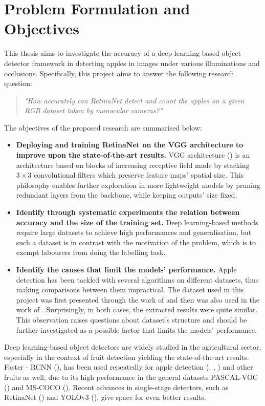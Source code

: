 \section{Problem Formulation and Objectives}
This thesis aims to investigate the accuracy of a deep learning-based object detector framework in detecting apples in images under various illuminations and occlusions. Specifically, this project aims to answer the following research question:

\begin{quote}
\centering 
\textit{"How accurately can RetinaNet detect and count the apples on a given RGB dataset taken by monocular cameras?"}
\end{quote}

The objectives of the proposed research are summarised below:

\begin{itemize}
\item \textbf{Deploying and training RetinaNet on the VGG architecture to improve upon the state-of-the-art results.} VGG architecture (\cite{simonyan2014very}) is an architecture based on blocks of increasing receptive field made by stacking $3\times3$ convolutional filters which preserve feature maps' spatial size. This philosophy enables further exploration in more lightweight models by pruning redundant layers from the backbone, while keeping outputs' size fixed.  
\item \textbf{Identify through systematic experiments the relation between accuracy and the size of the training set.} Deep learning-based methods require large datasets to achieve high performances and generalisation, but such a dataset is in contrast with the motivation of the problem, which is to exempt labourers from doing the labelling task.
\item \textbf{Identify the causes that limit the models' performance.} Apple detection has been tackled with several algorithms on different datasets, thus making comparisons between them impractical. The dataset used in this project was first presented through the work of \cite{bargoti2017deep} and then was also used in the work of \cite{liang2018apple}. Surprisingly, in both cases, the extracted results were quite similar. This observation raises questions about dataset's structure and should be further investigated as a possible factor that limits the models' performance.
\end{itemize}

Deep learning-based object detectors are widely studied in the agricultural sector, especially in the context of fruit detection yielding the state-of-the-art results. Faster - RCNN (\cite{ren2015faster}), has been used repeatedly for apple detection (\cite{sa2016deepfruits}, \cite{bargoti2017deep}, \cite{tao2018rapid}) and other fruits as well, due to its high performance in the general datasets PASCAL-VOC (\cite{everingham2010pascal}) and MS-COCO (\cite{lin2014microsoft}). Recent advances in single-stage detectors, such as RetinaNet (\cite{lin2017focal}) and YOLOv3 (\cite{redmon2018yolov3}), give space for even better results.

